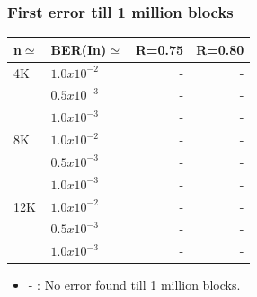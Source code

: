 \documentclass[xcolor=dvipsname]
{beamer}
\begin{document}
\begin{frame}[t] 
\frametitle{First error till 1 million blocks}

\begin{table}[]
\centering
\begin{tabular}{|l|l|r|r|}
\hline
n$\simeq$   & BER(In)$\simeq$    & R=0.75  & R=0.80  \\ \hline
4K  & $1.0x10^{-2}$  & -    & -       \\ 
    & $0.5x10^{-3}$  &-     & -       \\ 
    & $1.0x10^{-3}$  & -   & -       \\ \hline
8K  & $1.0x10^{-2}$   & -   & -           \\
    & $0.5x10^{-3}$ & -     & -       \\ 
    & $1.0x10^{-3}$   & -   & -                 \\ \hline
12K & $1.0x10^{-2}$   & -   & -        \\ 
    & $0.5x10^{-3}$ & -     & -     \\
    & $1.0x10^{-3}$   & - & -		\\ \hline 
\end{tabular}
\end{table}
\begin{itemize}
\item -	 : No error found till 1 million blocks. 
\end{itemize}
\end{frame}
\end{document}
